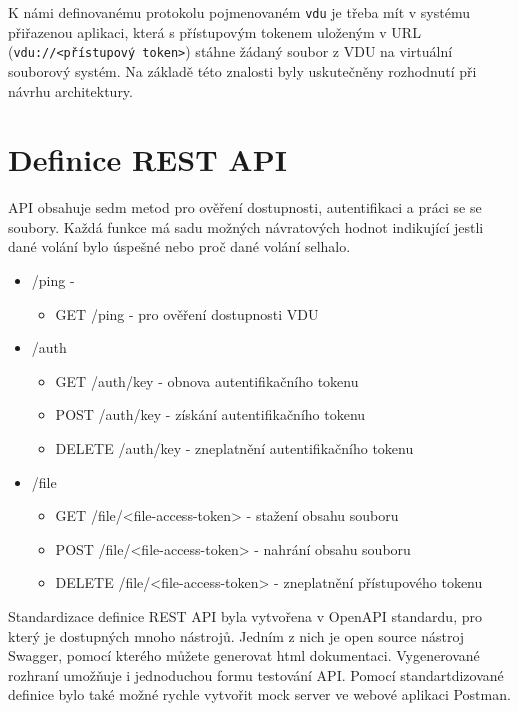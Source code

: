 K námi definovanému protokolu pojmenovaném \texttt{vdu} je třeba mít v systému přiřazenou aplikaci, která s přístupovým tokenem uloženým v URL 
(\texttt{vdu://<přístupový token>}) stáhne žádaný soubor z VDU na virtuální souborový systém. Na základě této znalosti byly uskutečněny rozhodnutí při návrhu architektury.
 
\section{Definice REST API}

API obsahuje sedm metod pro ověření dostupnosti, autentifikaci a práci se se soubory. Každá funkce má sadu možných návratových hodnot indikující jestli dané volání
bylo úspešné nebo proč dané volání selhalo.

\begin{itemize}
    \item /ping - 
    \begin{itemize}
        \item GET /ping - pro ověření dostupnosti VDU        
    \end{itemize}
    \item /auth
    \begin{itemize}
        \item GET /auth/key - obnova autentifikačního tokenu
        \item POST /auth/key - získání autentifikačního tokenu
        \item DELETE /auth/key - zneplatnění autentifikačního tokenu
    \end{itemize}
    \item /file
    \begin{itemize}
        \item GET /file/<file-access-token> - stažení obsahu souboru
        \item POST /file/<file-access-token> - nahrání obsahu souboru
        \item DELETE /file/<file-access-token> - zneplatnění přístupového tokenu
    \end{itemize}
\end{itemize}

Standardizace definice REST API byla vytvořena v OpenAPI standardu, pro který je dostupných mnoho nástrojů. Jedním z nich je open source nástroj Swagger, pomocí kterého
můžete generovat html dokumentaci. Vygenerované rozhraní umožňuje i jednoduchou formu testování API. Pomocí standartdizované definice bylo také možné rychle vytvořit 
mock server ve webové aplikaci Postman.

